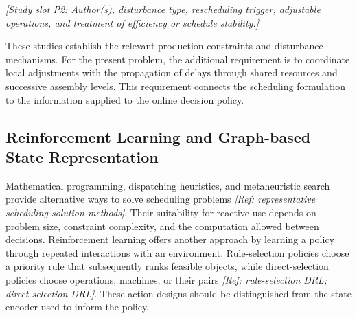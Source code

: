 
\textit{[Study slot P2: Author(s), disturbance type, rescheduling trigger, adjustable operations,
and treatment of efficiency or schedule stability.]}

These studies establish the relevant production constraints and disturbance mechanisms. For the present problem,
the additional requirement is to coordinate local adjustments with the propagation of delays through
shared resources and successive assembly levels. This requirement connects the scheduling formulation
to the information supplied to the online decision policy.


\subsection{Reinforcement Learning and Graph-based State Representation}
\label{subsec:drl_scheduling}

Mathematical programming, dispatching heuristics, and metaheuristic search provide alternative ways
to solve scheduling problems \textit{[Ref: representative scheduling solution methods]}.
Their suitability for reactive use depends on problem size, constraint complexity,
and the computation allowed between decisions. Reinforcement learning offers another approach by learning
a policy through repeated interactions with an environment. Rule-selection policies choose a priority rule
that subsequently ranks feasible objects, while direct-selection policies choose operations, machines,
or their pairs \textit{[Ref: rule-selection DRL; direct-selection DRL]}. These action designs should
be distinguished from the state encoder used to inform the policy.

